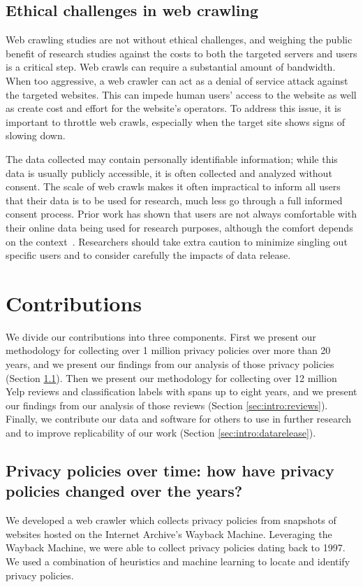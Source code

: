 \subsection{Ethical challenges in web crawling}
Web crawling studies are not without ethical challenges, and weighing the public benefit of research studies against the costs to both the targeted servers and users is a critical step. Web crawls can require a substantial amount of bandwidth. When too aggressive, a web crawler can act as a denial of service attack against the targeted websites. This can impede human users' access to the website as well as create cost and effort for the website's operators. To address this issue, it is important to throttle web crawls, especially when the target site shows signs of slowing down.

The data collected may contain personally identifiable information; while this data is usually publicly accessible, it is often collected and analyzed without consent. The scale of web crawls makes it often impractical to inform all users that their data is to be used for research, much less go through a full informed consent process. Prior work has shown that users are not always comfortable with their online data being used for research purposes, although the comfort depends on the context~\cite{fiesler2018participant}. Researchers should take extra caution to minimize singling out specific users and to consider carefully the impacts of data release.


\section{Contributions}

We divide our contributions into three components. First we present our methodology for collecting over 1 million privacy policies over more than 20 years, and we present our findings from our analysis of those privacy policies (Section \ref{sec:intro:privacypolicies}). Then we present our methodology for collecting over 12 million Yelp reviews and classification labels with spans up to eight years, and we present our findings from our analysis of those reviews (Section \ref{sec:intro:reviews}). Finally, we contribute our data and software for others to use in further research and to improve replicability of our work (Section \ref{sec:intro:datarelease}).


\subsection{Privacy policies over time: how have privacy policies changed over the years?} \label{sec:intro:privacypolicies}
We developed a web crawler which collects privacy policies from snapshots of websites hosted on the Internet Archive's Wayback Machine. Leveraging the Wayback Machine, we were able to collect privacy policies dating back to 1997. We used a combination of heuristics and machine learning to locate and identify privacy policies. 

